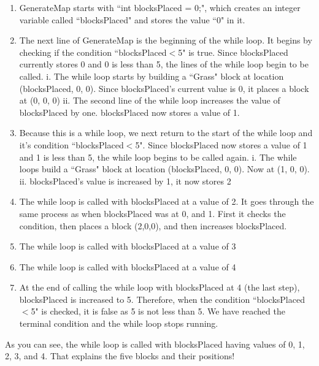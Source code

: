 \documentclass{article}
\begin{document}
\begin{enumerate}
 \item GenerateMap starts with ``int blocksPlaced = 0;", which creates an integer variable called ``blocksPlaced" and stores the value ``0" in it.
 \item The next line of GenerateMap is the beginning of the while loop. It begins by checking if the condition ``blocksPlaced$<$5" is true. Since blocksPlaced currently stores 0 and 0 is less than 5, the lines of the while loop begin to be called. 
  \newline 
 \newline\indent i. The while loop starts by building a ``Grass" block at location (blocksPlaced, 0, 0). Since blocksPlaced's current value is 0, it places a block at (0, 0, 0)
 \newline\indent ii. The second line of the while loop increases the value of blocksPlaced by one. blocksPlaced now stores a value of 1.
 \item Because this is a while loop, we next return to the start of the while loop and it's condition ``blocksPlaced$<$5". Since blocksPlaced now stores a value of 1 and 1 is less than 5, the while loop begins to be called again.
 \newline 
 \newline\indent i. The while loops build a ``Grass" block at location (blocksPlaced, 0, 0). Now at (1, 0, 0).
 \newline\indent ii. blocksPlaced's value is increased by 1, it now stores 2
  \item The while loop is called with blocksPlaced at a value of 2. It goes through the same process as when blocksPlaced was at 0, and 1. First it checks the condition, then places a block (2,0,0), and then increases blocksPlaced.
  \item The while loop is called with blocksPlaced at a value of 3
  \item The while loop is called with blocksPlaced at a value of 4
  \item At the end of calling the while loop with blocksPlaced at 4 (the last step), blocksPlaced is increased to 5. Therefore, when the condition ``blocksPlaced$<$5" is checked, it is false as 5 is not less than 5. We have reached the terminal condition and the while loop stops running. 
\end{enumerate}

As you can see, the while loop is called with blocksPlaced having values of 0, 1, 2, 3, and 4. That explains the five blocks and their positions! 
\end{document}
